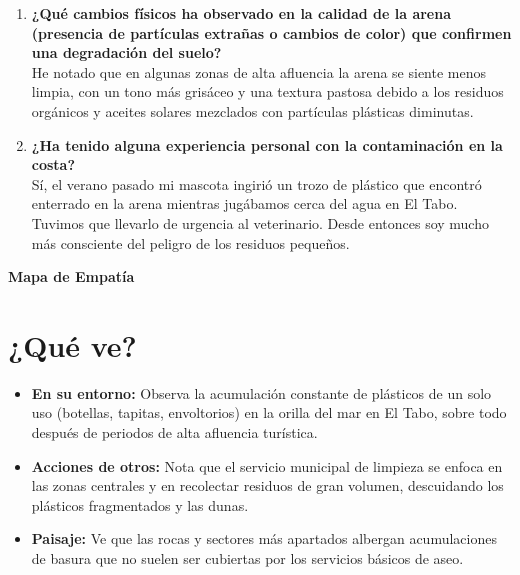 \documentclass[12pt,letterpaper]{article}
\begin{document}
\begin{enumerate}[leftmargin=*]
	\item \textbf{¿Qué cambios físicos ha observado en la calidad de la arena (presencia de partículas extrañas o cambios de color) que confirmen una degradación del suelo?} \\
	      He notado que en algunas zonas de alta afluencia la arena se siente menos limpia, con un tono más grisáceo y una textura pastosa debido a los residuos orgánicos y aceites solares mezclados con partículas plásticas diminutas.

	\item \textbf{¿Ha tenido alguna experiencia personal con la contaminación en la costa?} \\
	      Sí, el verano pasado mi mascota ingirió un trozo de plástico que encontró enterrado en la arena mientras jugábamos cerca del agua en El Tabo. Tuvimos que llevarlo de urgencia al veterinario. Desde entonces soy mucho más consciente del peligro de los residuos pequeños.
\end{enumerate}

\newpage

\begin{center}
	{\LARGE \textbf{Mapa de Empatía}}
\end{center}

\vspace{0.8cm}

\section*{¿Qué ve?}
\begin{itemize}[leftmargin=*]
	\item \textbf{En su entorno:} Observa la acumulación constante de plásticos de un solo uso (botellas, tapitas, envoltorios) en la orilla del mar en El Tabo, sobre todo después de periodos de alta afluencia turística.
	\item \textbf{Acciones de otros:} Nota que el servicio municipal de limpieza se enfoca en las zonas centrales y en recolectar residuos de gran volumen, descuidando los plásticos fragmentados y las dunas.
	\item \textbf{Paisaje:} Ve que las rocas y sectores más apartados albergan acumulaciones de basura que no suelen ser cubiertas por los servicios básicos de aseo.
\end{itemize}
\end{document}
